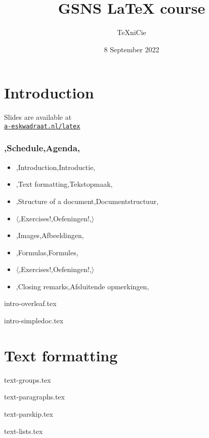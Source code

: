\documentclass[allauthors]{../../cursuspresentatie}
\title{GSNS \LaTeX{} course}
\author{\TeX niCie}
\date{8 September 2022}
\def\importslide#1#2{%
	{#2}
}
\begin{document}
\copyrightVincent
\copyrightTim

\section{Introduction}

\begin{frame}
	\titlepage
	\centering

	Slides are available at\\
	\href{https://a-eskwadraat.nl/latex}{\ul{\texttt{a-eskwadraat.nl/latex}}}
\end{frame}

\begin{frame}
	\frametitle{\lang,Schedule,Agenda,}
	
	\begin{itemize}
		\item \lang,Introduction,Introductie,
		\item \lang,Text formatting,Tekstopmaak,
		\item \lang,Structure of a document,Documentstructuur,
		\item $ \langle $\lang,Exercises!,Oefeningen!,$ \rangle $
		\item \lang,Images,Afbeeldingen,
		\item \lang,Formulas,Formules,
		\item $ \mathbf\langle $\lang,Exercises!,Oefeningen!,$ \rangle $
		\item \lang,Closing remarks,Afsluitende opmerkingen,
	\end{itemize}
\end{frame}

\importslide{intro}{intro-overleaf.tex}
\importslide{intro}{intro-simpledoc.tex}


\section{Text formatting}

\importslide{text}{text-groups.tex}


\importslide{text}{text-paragraphs.tex}

\importslide{text}{text-parskip.tex}



\importslide{text}{text-lists.tex}
\end{document}
